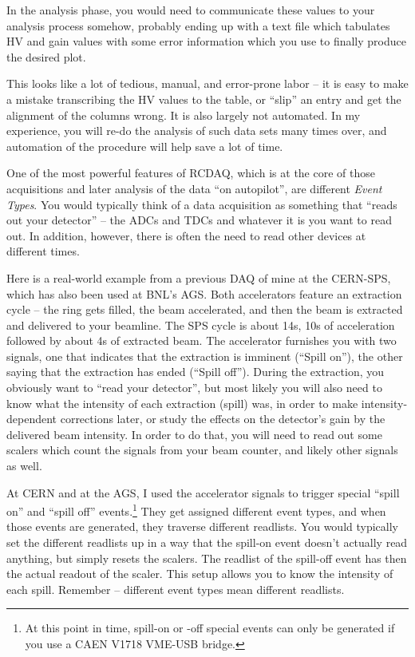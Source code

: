 \documentclass{article}[11pt]
\begin{document}
In the analysis phase, you would need to communicate
these values to your analysis process somehow, probably ending up with
a text file which tabulates HV and gain values with some error
information which you use to finally produce the desired plot.

This looks like a lot of tedious, manual, and error-prone labor -- it
is easy to make a mistake transcribing the HV values to the table, or
``slip'' an entry and get the alignment of the columns wrong. It is
also largely not automated. In my experience, you will re-do the
analysis of such data sets many times over, and automation of the
procedure will help save a lot of time.

One of the most powerful features of RCDAQ, which is at the core of
those acquisitions and later analysis of the data ``on autopilot'', are
different \emph{Event Types}. You would typically think of a data
acquisition as something that ``reads out your detector'' -- the ADCs
and TDCs and whatever it is you want to read out. In addition,
however, there is often the need to read other devices at different times. 

Here is a real-world example from a previous DAQ of mine at the
CERN-SPS, which has also been used at BNL's AGS. Both accelerators
feature an extraction cycle -- the ring gets filled, the beam
accelerated, and then the beam is extracted and delivered to your
beamline. The SPS cycle is about 14s, 10s of acceleration followed by
about 4s of extracted beam. The accelerator furnishes you with two
signals, one that indicates that the extraction is imminent (``Spill
on''), the other saying that the extraction has ended (``Spill
off''). During the extraction, you obviously want to ``read your
detector'', but most likely you will also need to know what the
intensity of each extraction (spill) was, in order to make
intensity-dependent corrections later, or study the effects on the
detector's gain by the delivered beam intensity. In order to do that,
you will need to read out some scalers which count the signals from
your beam counter, and likely other signals as well.

At CERN and at the AGS, I used the accelerator signals to trigger
special ``spill on'' and ``spill off'' events.\footnote{At this point
  in time, spill-on or -off special events can only be generated if
  you use a CAEN V1718 VME-USB bridge.  } They get assigned different
event types, and when those events are generated, they traverse
different readlists. You would typically set the different readlists
up in a way that the spill-on event doesn't actually read anything,
but simply resets the scalers. The readlist of the spill-off event has
then the actual readout of the scaler.  This setup allows you to know
the intensity of each spill. Remember -- different event types mean
different readlists.
\end{document}
